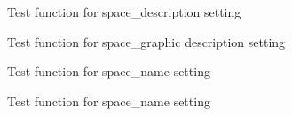 \begin{DoxyRefList}
%
Test function for space\+\_\+description setting  
\item[Member \mbox{\hyperlink{space__test_8h_af40c7a664b529a39c3d98dca3d0af708}{test2\+\_\+space\+\_\+set\+\_\+gdesc}} ()]\label{test__test000111}%
%
Test function for space\+\_\+graphic description setting  
\item[Member \mbox{\hyperlink{space__test_8h_a5a868ba017602ba6b58447cb394e81a6}{test2\+\_\+space\+\_\+set\+\_\+name}} ()]\label{test__test000108}%
%
Test function for space\+\_\+name setting  
\item[Member \mbox{\hyperlink{space__test_8h_aa24a337830006e33706ab6ac1c416b47}{test3\+\_\+space\+\_\+set\+\_\+name}} ()]\label{test__test000109}%
%
Test function for space\+\_\+name setting 
\end{DoxyRefList}